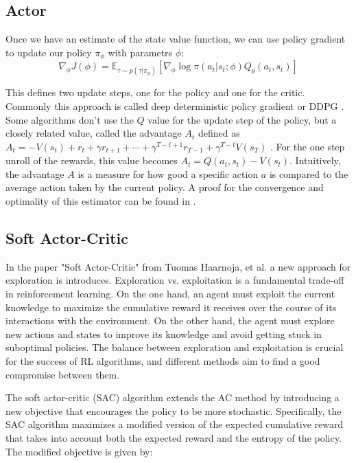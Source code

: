\subsection{Actor}
Once we have an estimate of the state value function, we can use policy gradient to update our policy $\pi_{\phi}$ with parametrs $\phi$:
\begin{equation}
    \nabla_{\phi} J(\phi) = \mathbb{E}_{\tau \sim p(\tau | \pi_{\phi})} \left[\nabla_{\phi} \log \pi(a_t|s_t;\phi) Q_{\theta}(a_t, s_t) \right]
\end{equation}

This defines two update steps, one for the policy and one for the critic. Commonly this approach is called deep deterministic policy gradient or DDPG \cite{https://arxiv.org/pdf/1509.02971.pdf}. Some algorithms don't use the $Q$ value for the update step of the policy, but a closely 
related value, called the advantage $A_t$ defined as $A_t = -V(s_t) + r_t + \gamma r_{t+1} + \cdots + \gamma^{T-t+1} r_{T-1} + \gamma^{T-t} V(s_T)$ \cite{A2C}. For the one step 
unroll of the rewards, this value becomes $A_t = Q(a_t, s_t) - V(s_t)$. 
Intuitively, the advantage $A$ is a measure for how good a specific action $a$ is compared to the average action taken by the current policy. 
A proof for the convergence and optimality of this estimator can be found in \cite{proof_A}.

\subsection{Soft Actor-Critic}
\label{SAC}
In the paper "Soft Actor-Critic" from Tuomas Haarnoja, et al. \cite{haarnoja2018soft} a new approach for exploration is introduces. Exploration vs. exploitation 
is a fundamental trade-off in reinforcement learning. On the one hand, an agent must exploit the current knowledge to maximize the cumulative reward it receives 
over the course of its interactions with the environment. On the other hand, the agent must explore new actions and states to improve its knowledge and avoid getting stuck in suboptimal policies. 
The balance between exploration and exploitation is crucial for the success of RL algorithms, and different methods aim to find a good compromise between them.

The soft actor-critic (SAC) algorithm extends the AC method by introducing a new objective that encourages the policy to be more stochastic. Specifically, the SAC algorithm maximizes a modified 
version of the expected cumulative reward that takes into account both the expected reward and the entropy of the policy. The modified objective is given by:

